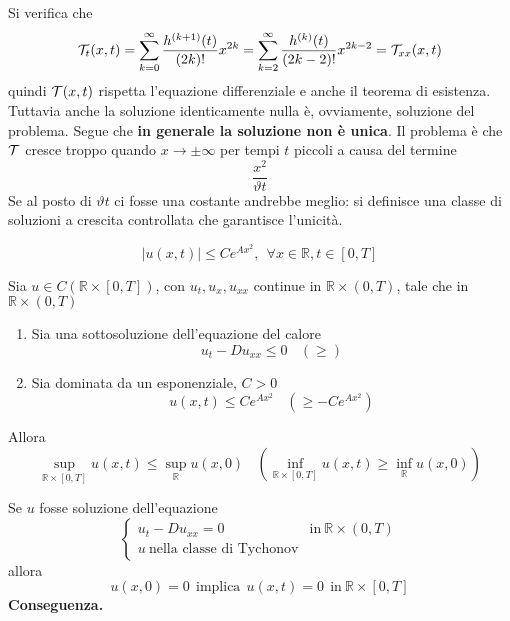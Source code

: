 \documentclass[10pt,a4paper,twoside,openright]{book}
\begin{document}
Si verifica che
\begin{equation*}
\mathcal{T} _{t}(x,t) =\sum\limits ^{\infty }_{k=0}\frac{h^{(k+1)}(t)}{(2k) !} x^{2k} =\sum\limits ^{\infty }_{k=2}\frac{h^{(k)}(t)}{(2k-2) !} x^{2k-2} =\mathcal{T} _{xx}(x,t)
\end{equation*}
quindi $\mathcal{T} (x,t)$ rispetta l'equazione differenziale e anche il teorema di esistenza. Tuttavia anche la soluzione identicamente nulla è, ovviamente, soluzione del problema. Segue che \textbf{in generale la soluzione non è unica}. Il problema è che $\mathcal{T} $ cresce troppo quando $x\rightarrow \pm \infty $ per tempi $t$ piccoli a causa del termine
\begin{equation*}
\frac{x^{2}}{\vartheta t}
\end{equation*}
Se al posto di $\vartheta t$ ci fosse una costante andrebbe meglio: si definisce una classe di soluzioni a crescita controllata che garantisce l'unicità.
\begin{definition}
\begin{equation*}
| u(x,t)| \leqslant Ce^{Ax^{2}},\ \ \forall x\in \mathbb{R},t\in [ 0,T]
\end{equation*}
\end{definition}
\begin{theorem}
 Sia $u\in C(\mathbb{R} \times [ 0,T])$, con $u_{t},u_{x},u_{xx}$ continue in $\mathbb{R} \times (0,T)$, tale che in $\mathbb{R} \times (0,T)$
\begin{enumerate}
\item Sia una sottosoluzione dell'equazione del calore\begin{equation*}
u_{t} -Du_{xx} \leqslant 0\ \ \ \ (\geqslant)
\end{equation*}
\item Sia dominata da un esponenziale, $C >0$\begin{equation*}
u(x,t) \leqslant Ce^{Ax^{2}} \ \ \ \ \left( \geqslant -Ce^{Ax^{2}}\right)
\end{equation*}
\end{enumerate}
Allora
\begin{equation*}
\sup _{\mathbb{R} \times [ 0,T]} u(x,t) \leqslant \sup _{\mathbb{R}} u(x,0) \ \ \ \ (\inf_{\mathbb{R} \times [ 0,T]} u(x,t) \geqslant \inf_{\mathbb{R}} u(x,0))
\end{equation*}
\end{theorem}

Se $u$ fosse soluzione dell'equazione
\begin{equation*}
\begin{cases}
u_{t} -Du_{xx} =0 & \text{in} \ \mathbb{R} \times (0,T)\\
u\ \text{nella classe di Tychonov} & 
\end{cases}
\end{equation*}
allora
\begin{equation*}
u(x,0) =0\ \ \text{implica} \ \ u(x,t) =0\ \ \text{in} \ \mathbb{R} \times [ 0,T]
\end{equation*}
\textbf{Conseguenza.}
\end{document}

